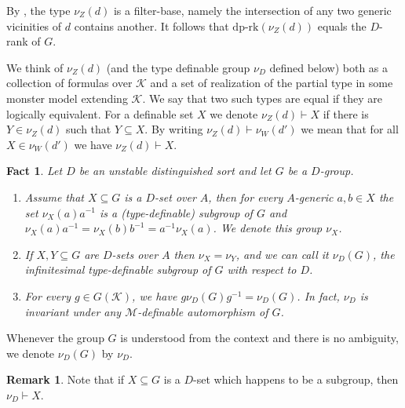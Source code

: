 \documentclass[11pt]{amsart}
\newtheorem{fact}[theorem]{Fact}
\theoremstyle{definition}
\newtheorem{remark}[theorem]{Remark}
\newcommand{\CK}{{\mathcal K}}
\newcommand{\CM}{{\mathcal M}}
\newcommand{\0}{\emptyset}
\def\dpr{\mathrm{dp\text{-}rk}}
\def\sub{\subseteq}
\begin{document}
By \cite[Lemma 4.20]{HaHaPeGps}, the type $\nu_Z(d)$ is a filter-base, namely the intersection of any two generic vicinities of $d$ contains another. It follows that $\dpr(\nu_Z(d))$ equals the $D$-rank of $G$.

We think of $\nu_Z(d)$ (and the type definable group $\nu_D$ defined below) both as a collection of formulas over $\CK$ and a set of realization of the partial type in some monster model extending $\CK$. We say that two such types are equal if they are logically equivalent. For a definable set $X$ we denote $\nu_Z(d)\vdash X$  if there is $Y\in \nu_Z(d)$ such that $Y\sub X$. By writing $\nu_Z(d)\vdash \nu_W(d')$ we mean that for all $X\in \nu_W(d')$ we have $\nu_Z(d)\vdash X$.



\begin{fact}\cite[Proposition 5.8]{HaHaPeGps}\label{F: properties of nu}
Let $D$ be an unstable distinguished sort and  let $G$ be a $D$-group.
\begin{enumerate}
\item Assume that $X\subseteq G$ is a $D$-set over $A$, then for every $A$-generic $a,b\in X$ the set $\nu_X(a)a^{-1}$ is a (type-definable) subgroup of $G$ and  
$\nu_X(a)a^{-1}=\nu_X(b)b^{-1}=a^{-1}\nu_X(a)$. We denote this group $\nu_X$.

\item If $X,Y\sub G$ are $D$-sets over $A$ then $\nu_X=\nu_Y$, and we can call it $\nu_D(G)$, \emph{the infinitesimal type-definable subgroup of $G$ with respect to $D$}.
\item For every $g\in G(\CK)$, we have $g\nu_D(G) g^{-1}=\nu_D(G)$. In fact, $\nu_D$ is invariant under any $\CM$-definable automorphism of $G$. 
\end{enumerate}
\end{fact}

Whenever the group $G$ is understood from the context and there is no ambiguity, we denote $\nu_D(G)$ by $\nu_D$.

\begin{remark}\label{R: nu lives on any definable subgroup witnessing}
Note that if $X\subseteq G$ is a $D$-set which  happens to be a subgroup, then $\nu_D\vdash X$. 
\end{remark}
\end{document}
